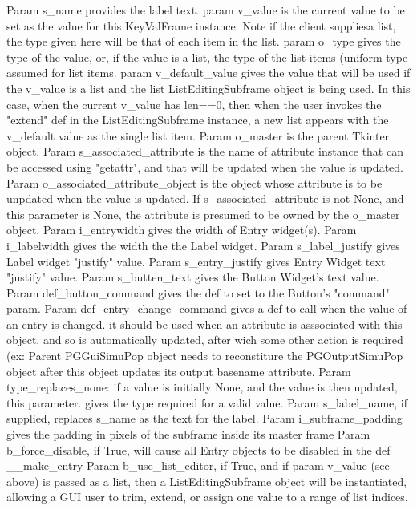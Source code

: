\begin{DoxyVerb}Param s_name provides the label text.
param v_value is the current value to be set as the
value for this KeyValFrame instance.  Note
if the client suppliesa list, the type given
here will be that of each item in the list.
param o_type gives the type of the value, or, if
the value is a list, the type of the list items
(uniform type assumed for list items.
param v_default_value gives the value that will be used
if the v_value is a list and the list ListEditingSubframe
object is being used.  In this case, when the current v_value
has len==0, then when the user invokes the "extend" def
in the ListEditingSubframe instance, a new list appears with
the v_default value as the single list item.
Param o_master is the parent Tkinter object.
Param s_associated_attribute is the name of 
    attribute instance that can be accessed
    using "getattr", and that will be
    updated when the value is updated.
Param o_associated_attribute_object is the object whose attribute
    is to be unpdated when the value is updated.  If
    s_associated_attribute is not None, and this parameter
    is None, the attribute is presumed to be
    owned by the o_master object.
Param i_entrywidth gives the width of Entry widget(s).
Param i_labelwidth gives the width the the Label widget.
Param s_label_justify gives Label widget "justify" value.
Param s_entry_justify gives Entry Widget text "justify" value.
Param s_butten_text gives the Button Widget's text value.
Param def_button_command gives the def to set to the Button's "command" param.
Param def_entry_change_command gives a def to call when the value of an entry is changed.             
      it should be used when an attribute is asssociated with this object,
      and so is automatically updated, after wich some other action is required 
      (ex: Parent PGGuiSimuPop object needs to reconstiture the PGOutputSimuPop object 
      after this object updates its output basename attribute.
Param type_replaces_none: if a value is initially None, and the value is then updated, 
      this parameter.
      gives the type required for a valid value.
Param s_label_name, if supplied, replaces s_name as the text for the label.
Param i_subframe_padding gives the padding in pixels of the subframe inside its master frame
Param b_force_disable, if True, will cause all Entry objects to be disabled 
      in the def __make_entry
Param b_use_list_editor, if True, and if param v_value (see above) is passed as a list, 
      then a ListEditingSubframe object will be instantiated, allowing a GUI user to
      trim, extend, or assign one value to a range of list indices.
\end{DoxyVerb}
 

